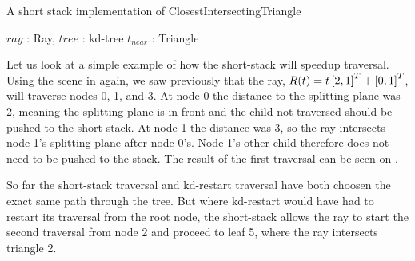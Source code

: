 \begin{algorithm}
  \caption{A short stack implementation of ClosestIntersectingTriangle}
  \label{alg:ShortStack}
  \begin{algorithmic}
              {$ray$ : Ray, $tree$ : kd-tree}
              {$t_{near}$ : Triangle}{
      \ELSE
      \ENDIF
          \ENDIF
        \ELSE
        \ENDIF
      \ENDWHILE
      \ELSE
      \ENDIF
    \ENDWHILE
              }
  \end{algorithmic}
\end{algorithm}


Let us look at a simple example of how the short-stack will speedup
traversal. Using the scene in  again, we saw
previously that the ray, $R(t) = t \left[2, 1 \right]^T + \left[0, 1 \right]^T$, will
traverse nodes 0, 1, and 3. At node 0 the distance to the splitting plane was 2,
meaning the splitting plane is in front and the child not traversed should be
pushed to the short-stack. At node 1 the distance was 3, so the ray intersects
node 1's splitting plane after node 0's. Node 1's other child therefore does not
need to be pushed to the stack. The result of the first traversal can be seen on
.

So far the short-stack traversal and kd-restart traversal have both choosen the
exact same path through the tree. But where kd-restart would have had to restart
its traversal from the root node, the short-stack allows the ray to start the
second traversal from node 2 and proceed to leaf 5, where the ray intersects
triangle 2.

